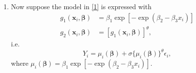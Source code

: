 \documentclass[12pt]{article}
\begin{document}
\begin{enumerate}
  \item Now suppose the model in \eqref{1} is expressed with 
    \begin{align}
      g_1(\bm{x}_i,\bm{\beta}) & = \beta_1\exp\left[ -\exp(\beta_2 - \beta_3x_i) \right] \nonumber \\
      g_2(\bm{x}_i, \bm{\beta}) & = [g_1(\bm{x}_i,\bm{\beta})]^{\theta},
      \label{4}
    \end{align}
    i.e. 
    \begin{equation}
      Y_i = \mu_i(\bm{\beta}) + \sigma\{\mu_i(\bm{\beta})\}^{\theta}\epsilon_i,
      \label{5}
    \end{equation}
    where $\mu_i(\bm{\beta}) = \beta_1\exp\left[ -\exp(\beta_2 - \beta_3x_i) \right]$.

\end{enumerate}
\end{document}
